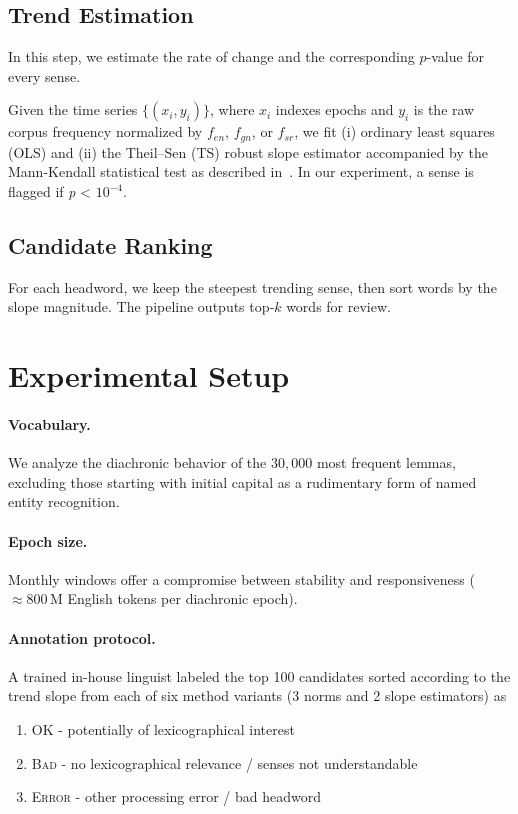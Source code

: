 \documentclass[11pt]{article}
\begin{document}
\subsection{Trend Estimation}
\label{sec:trend}
In this step, we estimate the rate of change and the corresponding $p$-value for every sense.

Given the time series $\{(x_i,y_i)\}$, where $x_i$ indexes epochs
and $y_i$ is the raw corpus frequency normalized by $f_{en}$, $f_{gn}$, or $f_{sr}$,
we fit (i) ordinary least squares (OLS) and
(ii) the Theil–Sen (TS) robust slope estimator accompanied by the Mann-Kendall statistical test as described in~\citet{trendy}.
In our experiment, a sense is flagged if \emph{p} < $10^{-4}$.

\subsection{Candidate Ranking}

For each headword, we keep the steepest trending sense,
then sort words by the slope magnitude.
The pipeline outputs top‑$k$ words
for review.

\section{Experimental Setup}
\paragraph{Vocabulary.}
We analyze the diachronic behavior of the $30,000$ most frequent lemmas,
excluding those starting with initial capital as a rudimentary form of named entity recognition.

\paragraph{Epoch size.}
Monthly windows offer a compromise between stability
and responsiveness ($\approx800$\,M English tokens per diachronic epoch).

\paragraph{Annotation protocol.}
A trained in-house linguist labeled the top 100
candidates sorted according to the trend slope from each of six method variants (3 norms and 2 slope estimators)
as \begin{enumerate}
    \item \textsc{OK} - potentially of lexicographical interest
    \item \textsc{Bad} - no lexicographical relevance / senses not understandable
    \item \textsc{Error} - other processing error / bad headword
\end{enumerate}
\end{document}
